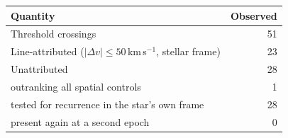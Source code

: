 \begin{tabular}{@{}lr@{}}
\hline
Quantity & Observed \\
\hline
Threshold crossings & 51 \\
Line-attributed ($|\Delta v|\leq50$\,km\,s$^{-1}$, stellar frame) & 23 \\
Unattributed & 28 \\
\quad outranking all spatial controls & 1 \\
\quad tested for recurrence in the star's own frame & 28 \\
\quad present again at a second epoch & 0 \\
\hline
\end{tabular}
